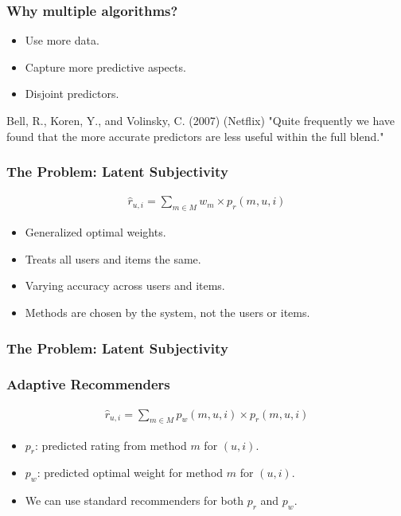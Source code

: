 \documentclass[screen]{beamer}
\begin{document}
\begin{frame}
  \frametitle{Why multiple algorithms?}
  \begin{itemize}
    \item Use more data.
    \item Capture more predictive aspects.
    \item Disjoint predictors.
  \end{itemize}
  
  \begin{block}{Bell, R., Koren, Y., and Volinsky, C. (2007) (Netflix)}
    "Quite frequently we have found that the more accurate predictors are less useful within the full blend."
  \end{block}
\end{frame}

\begin{frame}
  \frametitle{The Problem: Latent Subjectivity}
  \begin{eqnarray}
    \hat{r}_{u,i} = \sum_{m \in M} w_{m} \times p_{r}(m,u,i)
  \end{eqnarray}
  \begin{itemize}
    \item Generalized optimal weights.
    \item Treats all users and items the same.
    \item Varying accuracy across users and items.
    \item Methods are chosen by the system, not the users or items.
  \end{itemize}
\end{frame}

\begin{frame}
  \frametitle{The Problem: Latent Subjectivity}
  \huge
  \linespread{2}{
    Systems that insist on being adaptive in a certain way
    are not really adaptive at all.  
  }
\end{frame}

\begin{frame}
  \frametitle{Adaptive Recommenders}
  \begin{eqnarray}
    \hat{r}_{u,i} = \sum_{m \in M} p_{w}(m,u,i) \times p_{r}(m,u,i)
  \end{eqnarray}
  \begin{itemize}
    \item $p_r$: predicted rating from method $m$ for $(u,i)$.
    \item $p_w$: predicted optimal weight for method $m$ for $(u,i)$.
    \item We can use standard recommenders for both $p_r$ and $p_w$.
  \end{itemize}
\end{frame}
\end{document}
